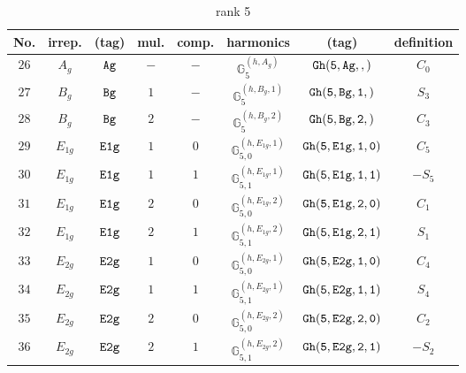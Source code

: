 \documentclass[fleqn,8pt]{jsarticle}
\begin{document}
\begin{table}[ht!]
\begin{center}
\caption{rank 5}
\renewcommand{\arraystretch}{1.3}
\begin{tabular}{cccccccc} \hline \hline
No. & irrep. & (tag) & mul. & comp. & harmonics & (tag) & definition \\ \hline
$ 26 $ & $ A_{g} $ & $ {\tt Ag} $ & $ - $ & $ - $ & $ \mathbb{G}_{5}^{(h,A_{g})} $ & $ {\tt Gh(5,Ag,,)} $ & $ C_{0} $ \\
$ 27 $ & $ B_{g} $ & $ {\tt Bg} $ & $ 1 $ & $ - $ & $ \mathbb{G}_{5}^{(h,B_{g},1)} $ & $ {\tt Gh(5,Bg,1,)} $ & $ S_{3} $ \\
$ 28 $ & $ B_{g} $ & $ {\tt Bg} $ & $ 2 $ & $ - $ & $ \mathbb{G}_{5}^{(h,B_{g},2)} $ & $ {\tt Gh(5,Bg,2,)} $ & $ C_{3} $ \\
$ 29 $ & $ E_{1g} $ & $ {\tt E1g} $ & $ 1 $ & $ 0 $ & $ \mathbb{G}_{5,0}^{(h,E_{1g},1)} $ & $ {\tt Gh(5,E1g,1,0)} $ & $ C_{5} $ \\
$ 30 $ & $ E_{1g} $ & $ {\tt E1g} $ & $ 1 $ & $ 1 $ & $ \mathbb{G}_{5,1}^{(h,E_{1g},1)} $ & $ {\tt Gh(5,E1g,1,1)} $ & $ - S_{5} $ \\
$ 31 $ & $ E_{1g} $ & $ {\tt E1g} $ & $ 2 $ & $ 0 $ & $ \mathbb{G}_{5,0}^{(h,E_{1g},2)} $ & $ {\tt Gh(5,E1g,2,0)} $ & $ C_{1} $ \\
$ 32 $ & $ E_{1g} $ & $ {\tt E1g} $ & $ 2 $ & $ 1 $ & $ \mathbb{G}_{5,1}^{(h,E_{1g},2)} $ & $ {\tt Gh(5,E1g,2,1)} $ & $ S_{1} $ \\
$ 33 $ & $ E_{2g} $ & $ {\tt E2g} $ & $ 1 $ & $ 0 $ & $ \mathbb{G}_{5,0}^{(h,E_{2g},1)} $ & $ {\tt Gh(5,E2g,1,0)} $ & $ C_{4} $ \\
$ 34 $ & $ E_{2g} $ & $ {\tt E2g} $ & $ 1 $ & $ 1 $ & $ \mathbb{G}_{5,1}^{(h,E_{2g},1)} $ & $ {\tt Gh(5,E2g,1,1)} $ & $ S_{4} $ \\
$ 35 $ & $ E_{2g} $ & $ {\tt E2g} $ & $ 2 $ & $ 0 $ & $ \mathbb{G}_{5,0}^{(h,E_{2g},2)} $ & $ {\tt Gh(5,E2g,2,0)} $ & $ C_{2} $ \\
$ 36 $ & $ E_{2g} $ & $ {\tt E2g} $ & $ 2 $ & $ 1 $ & $ \mathbb{G}_{5,1}^{(h,E_{2g},2)} $ & $ {\tt Gh(5,E2g,2,1)} $ & $ - S_{2} $ \\
 \hline \hline
\end{tabular}
\end{center}
\end{table}
\end{document}
